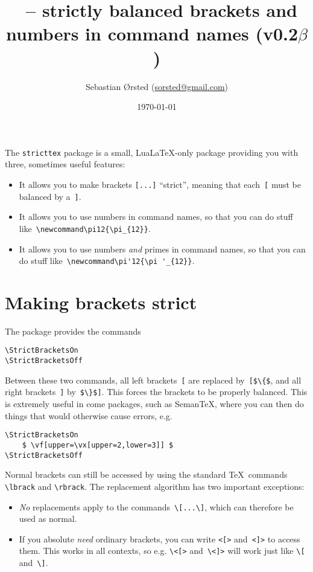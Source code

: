 \documentclass[a4paper,article,oneside,10pt]{memoir}
\title{\strctttex\ -- strictly balanced brackets and numbers in command names (v0.2$\beta$)}
\date{\today}
\author{Sebastian \O rsted (\href{mailto:sorsted@gmail.com}{sorsted@gmail.com})}
\newcommand\strctttex{\texttt{stricttex}\xspace}
\begin{document}
\maketitle

\noindent 
The \strctttex package is a small, Lua\LaTeX-only package providing you with three, sometimes useful features:
\begin{itemize}
	\item It allows you to make brackets \lstinline![...]! ``strict'', meaning that each~\lstinline![!
	must be balanced by a~\lstinline!]!.
	\item It allows you to use numbers in command names, so
	that you can do stuff like~\lstinline!\newcommand\pi12{\pi_{12}}!.
	\item It allows you to use numbers \emph{and} primes in command names,
	so that you can do stuff like~\lstinline!\newcommand\pi'12{\pi '_{12}}!.
\end{itemize}

\chapter*{Making brackets strict}

The package provides the commands
\begin{lstlisting}
\StrictBracketsOn
\StrictBracketsOff
\end{lstlisting}
Between these two commands,
all left brackets~\lstinline![! are replaced by~\lstinline![$\{$!,
and all right brackets~\lstinline!]! by~\lstinline!$\}$]!. This forces the brackets to be properly balanced. This is extremely useful in come packages, such as Seman\TeX, where you can then
do things that would otherwise cause errors, e.g.
\begin{lstlisting}[mathescape=false]
\StrictBracketsOn
	$ \vf[upper=\vx[upper=2,lower=3]] $
\StrictBracketsOff
\end{lstlisting}
Normal brackets can still be accessed by using the standard \TeX\ commands 
\lstinline!\lbrack! and \lstinline!\rbrack!.
The replacement algorithm has two important exceptions:
\begin{itemize}
	\item \emph{No} replacements apply to the commands~\lstinline!\[...\]!, which can therefore be used as normal.
	\item If you absolute \emph{need} ordinary brackets,
	you can write \lstinline!<[>! and~\lstinline!<]>! to access them. This works
	in all contexts, so e.g. \lstinline!\<[>! and~\lstinline!\<]>! will work
	just like \lstinline!\[! and~\lstinline!\]!.
\end{itemize}
\end{document}
